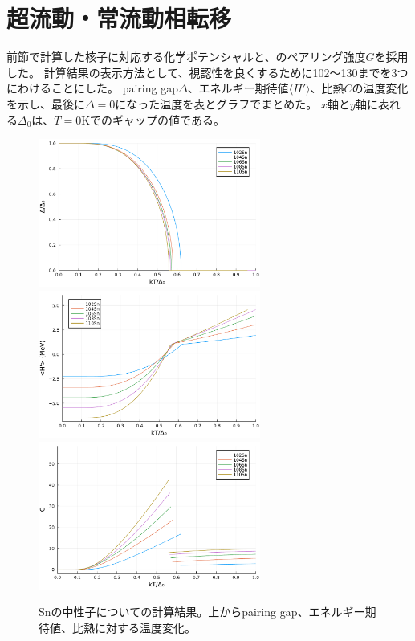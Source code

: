 \documentclass[a4paper]{jsreport}
\begin{document}
  \section{超流動・常流動相転移}
  前節で計算した核子に対応する化学ポテンシャルと、のペアリング強度\(G\)を採用した。
  計算結果の表示方法として、視認性を良くするために102～130までを3つにわけることにした。
  pairing gap\(\Delta\)、エネルギー期待値\(\langle H'\rangle\)、比熱\(C\)の温度変化を示し、最後に\(\Delta=0\)になった温度を表とグラフでまとめた。
  $x$軸と$y$軸に表れる\(\Delta_0\)は、\(T=0\)Kでのギャップの値である。
  \begin{figure}[H]
    \centering
    \includegraphics[width=0.65\textwidth]{main_fig/102d.pdf}
    \includegraphics[width=0.65\textwidth]{main_fig/102H.pdf}
    \includegraphics[width=0.65\textwidth]{main_fig/102C.pdf}
    \caption{Snの中性子についての計算結果。上からpairing gap、エネルギー期待値、比熱に対する温度変化。}
  \end{figure}
\end{document}
